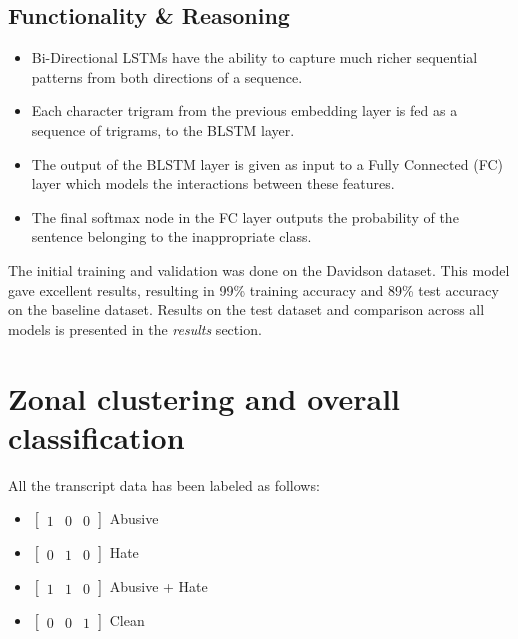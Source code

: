 \documentclass{article}[A4]
\begin{document}
\subsection{Functionality \& Reasoning}

\begin{itemize}
	\item{Bi-Directional LSTMs have the ability to capture much richer sequential patterns from both directions of a sequence.}
	\item{Each character trigram from the previous embedding layer is fed as a sequence of trigrams, to the BLSTM layer.}
	\item{The output of the BLSTM layer is given as input to a Fully Connected (FC) layer which models the interactions between these features.}
	\item{The final softmax node in the FC layer outputs the probability of the sentence belonging to the inappropriate class.}
\end{itemize}



The initial training and validation was done on the Davidson dataset. This model gave excellent results, resulting in 99\% training accuracy and 89\% test accuracy on the baseline dataset. Results on the test dataset and comparison across all models is presented in the \textit{results} section.

\section{Zonal clustering and overall classification}

All the transcript data has been labeled as follows:
\begin{itemize}
\item {$\begin{bmatrix}1 & 0 & 0\end{bmatrix}$ Abusive}
\item {$\begin{bmatrix}0 & 1 & 0\end{bmatrix}$ Hate}
\item {$\begin{bmatrix}1 & 1 & 0\end{bmatrix}$ Abusive + Hate}
\item {$\begin{bmatrix}0 & 0 & 1\end{bmatrix}$ Clean}
\end{itemize}
\end{document}
